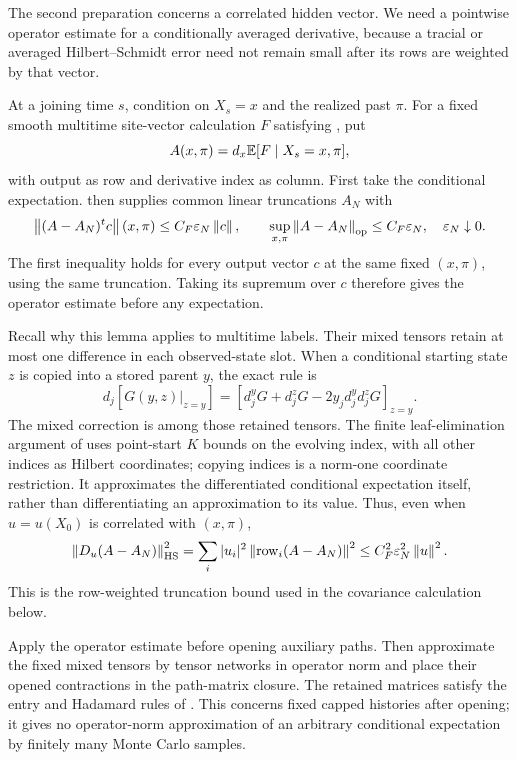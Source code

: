 The second preparation concerns a correlated hidden vector. We need a
pointwise operator estimate for a conditionally averaged derivative,
because a tracial or averaged Hilbert--Schmidt error need not remain
small after its rows are weighted by that vector.

At a joining time $s$, condition on $X_s=x$ and the realized past $\pi$.
For a fixed smooth multitime site-vector calculation $F$ satisfying
, put
\[
 A(x,\pi)=d_x\mathbb E[F\mid X_s=x,\pi],
\]
with output as row and derivative index as column. First take the
conditional expectation. 
then supplies common linear truncations $A_N$ with
\begin{equation}\label{eq:hidden-conditional-op}
 \left\lVert (A-A_N)^tc\right\rVert(x,\pi)
 \leq C_F\varepsilon_N\left\lVert c\right\rVert,\qquad
 \sup_{x,\pi}\left\lVert A-A_N\right\rVert_{\mathrm{op}}\leq C_F\varepsilon_N,
 \quad\varepsilon_N\downarrow0.
\end{equation}
The first inequality holds for every output vector $c$ at the same
fixed $(x,\pi)$, using the same truncation. Taking its supremum over
$c$ therefore gives the operator estimate before any expectation.

Recall why this lemma applies to multitime labels. Their mixed tensors
retain at most one difference in each observed-state slot. When a
conditional starting state $z$ is copied into a stored parent $y$, the
exact rule is
\[
 d_j[G(y,z)|_{z=y}]
 =[d_j^yG+d_j^zG-2y_jd_j^yd_j^zG]_{z=y}.
\]
The mixed correction is among those retained tensors. The finite
leaf-elimination argument of 
uses point-start $K$ bounds on the evolving index, with all other
indices as Hilbert coordinates; copying indices is a norm-one
coordinate restriction. It approximates the differentiated conditional
expectation itself, rather than differentiating an approximation to
its value. Thus, even when $u=u(X_0)$ is correlated with $(x,\pi)$,
\begin{equation}\label{eq:hidden-row-weighted-error}
 \left\lVert D_u(A-A_N)\right\rVert_{\mathrm{HS}}^2
 =\sum_i|u_i|^2\left\lVert \operatorname{row}_i(A-A_N)\right\rVert^2
 \leq C_F^2\varepsilon_N^2\left\lVert u\right\rVert^2.
\end{equation}
This is the row-weighted truncation bound used in the covariance
calculation below.

Apply the operator estimate before opening auxiliary paths. Then
approximate the fixed mixed tensors by tensor networks in operator
norm and place their opened contractions in the path-matrix closure.
The retained matrices satisfy the entry and Hadamard rules of
. This concerns fixed capped histories after
opening; it gives no operator-norm approximation of an arbitrary
conditional expectation by finitely many Monte Carlo samples.

